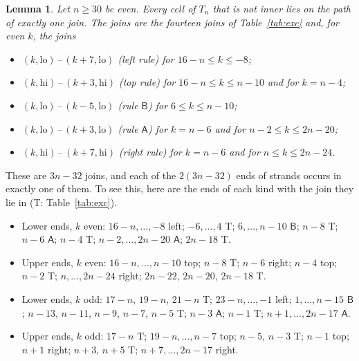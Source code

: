 \documentclass[11pt]{amsart}
\newtheorem{lemma}[theorem]{Lemma}
\theoremstyle{remark}
\newcommand{\lo}{\mathrm{lo}}
\newcommand{\hi}{\mathrm{hi}}
\begin{document}
\begin{lemma}\label{lem:exc}
Let $n\ge30$ be even. Every cell of $T_n$ that is not inner lies on the path of exactly one join. The joins are
the fourteen joins of Table~\ref{tab:exc} and, for even $k$, the joins
\begin{itemize}
\item $(k,\lo)\,\text{--}\,(k+7,\lo)$ (left rule) for $16-n\le k\le-8$;
\item $(k,\hi)\,\text{--}\,(k+3,\hi)$ (top rule) for $16-n\le k\le n-10$ and for $k=n-4$;
\item $(k,\lo)\,\text{--}\,(k-5,\lo)$ (rule $\mathsf B$) for $6\le k\le n-10$;
\item $(k,\lo)\,\text{--}\,(k+3,\lo)$ (rule $\mathsf A$) for $k=n-6$ and for $n-2\le k\le2n-20$;
\item $(k,\hi)\,\text{--}\,(k+7,\hi)$ (right rule) for $k=n-6$ and for $n\le k\le2n-24$.
\end{itemize}
\end{lemma}
These are $3n-32$ joins, and each of the $2(3n-32)$ ends of strands occurs in exactly one of them. To see this, here
are the ends of each kind with the join they lie in (T: Table~\ref{tab:exc}).
\begin{itemize}
\item Lower ends, $k$ even: $16-n,\dots,-8$ left; $-6,\dots,4$ T; $6,\dots,n-10$ $\mathsf B$; $n-8$ T; $n-6$ $\mathsf A$;
$n-4$ T; $n-2,\dots,2n-20$ $\mathsf A$; $2n-18$ T.
\item Upper ends, $k$ even: $16-n,\dots,n-10$ top; $n-8$ T; $n-6$ right; $n-4$ top; $n-2$ T; $n,\dots,2n-24$ right;
$2n-22$, $2n-20$, $2n-18$ T.
\item Lower ends, $k$ odd: $17-n$, $19-n$, $21-n$ T; $23-n,\dots,-1$ left; $1,\dots,n-15$ $\mathsf B$; $n-13$, $n-11$, $n-9$,
$n-7$, $n-5$ T; $n-3$ $\mathsf A$; $n-1$ T; $n+1,\dots,2n-17$ $\mathsf A$.
\item Upper ends, $k$ odd: $17-n$ T; $19-n,\dots,n-7$ top; $n-5$, $n-3$ T; $n-1$ top; $n+1$ right; $n+3$, $n+5$ T;
$n+7,\dots,2n-17$ right.
\end{itemize}
\end{document}
